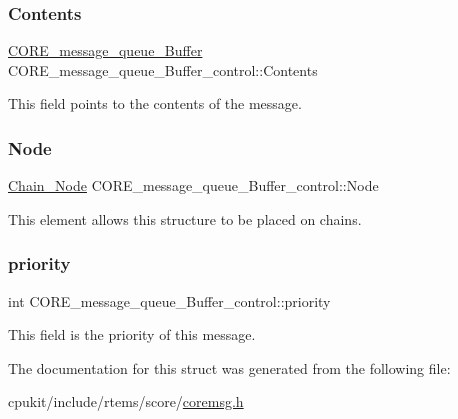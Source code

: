 \subsubsection{\texorpdfstring{Contents}{Contents}}
{\footnotesize\ttfamily \mbox{\hyperlink{structCORE__message__queue__Buffer}{C\+O\+R\+E\+\_\+message\+\_\+queue\+\_\+\+Buffer}} C\+O\+R\+E\+\_\+message\+\_\+queue\+\_\+\+Buffer\+\_\+control\+::\+Contents}

This field points to the contents of the message. \mbox{\label{structCORE__message__queue__Buffer__control_a340d227743eb3d5913cfaae11f0053d2}} 
\subsubsection{\texorpdfstring{Node}{Node}}
{\footnotesize\ttfamily \mbox{\hyperlink{group__RTEMSScoreChain_ga0dd4bfcca1ac7f90de2842e447846d3d}{Chain\+\_\+\+Node}} C\+O\+R\+E\+\_\+message\+\_\+queue\+\_\+\+Buffer\+\_\+control\+::\+Node}

This element allows this structure to be placed on chains. \mbox{\label{structCORE__message__queue__Buffer__control_af9e844de530444d5580fb92870ae0c5c}} 
\subsubsection{\texorpdfstring{priority}{priority}}
{\footnotesize\ttfamily int C\+O\+R\+E\+\_\+message\+\_\+queue\+\_\+\+Buffer\+\_\+control\+::priority}

This field is the priority of this message. 

The documentation for this struct was generated from the following file\+:\begin{DoxyCompactItemize}
\item 
cpukit/include/rtems/score/\mbox{\hyperlink{coremsg_8h}{coremsg.\+h}}\end{DoxyCompactItemize}
